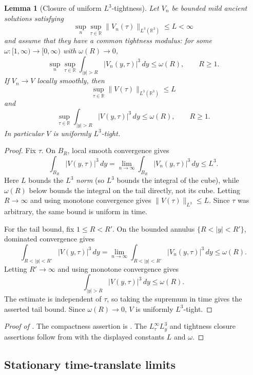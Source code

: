 \documentclass[11pt]{amsart}
\theoremstyle{plain}
\newtheorem{lemma}[lemma]{Lemma}
\theoremstyle{definition}
\theoremstyle{remark}
\numberwithin{equation}{section}
\newcommand{\R}{\mathbb R}
\begin{document}
\begin{lemma}[Closure of uniform \(L^3\)-tightness]\label{p2:lem:tight-closure}
Let \(V_n\) be bounded mild ancient solutions satisfying
\[
   \sup_n\sup_{\tau\in\R}\|V_n(\tau)\|_{L^3(\R^3)}\le L<\infty
\]
and assume that they have a common tightness modulus: for some
\(\omega:[1,\infty)\to[0,\infty)\) with \(\omega(R)\to0\),
\[
   \sup_n\sup_{\tau\in\R}
   \int_{|y|>R}|V_n(y,\tau)|^3\,dy\le \omega(R),
   \qquad R\ge1.
\]
If \(V_n\to V\) locally smoothly, then
\[
   \sup_{\tau\in\R}\|V(\tau)\|_{L^3(\R^3)}\le L
\]
and
\[
   \sup_{\tau\in\R}
   \int_{|y|>R}|V(y,\tau)|^3\,dy\le \omega(R),
   \qquad R\ge1.
\]
In particular \(V\) is uniformly \(L^3\)-tight.
\end{lemma}

\begin{proof}
Fix \(\tau\).  On \(B_R\), local smooth convergence gives
\[
   \int_{B_R}|V(y,\tau)|^3\,dy
   =
   \lim_{n\to\infty}\int_{B_R}|V_n(y,\tau)|^3\,dy
   \le L^3 .
\]
Here \(L\) bounds the \(L^3\) \emph{norm} (so \(L^3\) bounds the integral of
the cube), while \(\omega(R)\) below bounds the integral on the tail
directly, not its cube.
Letting \(R\to\infty\) and using monotone convergence gives
\(\|V(\tau)\|_{L^3}\le L\).  Since \(\tau\) was arbitrary, the same bound is
uniform in time.

For the tail bound, fix \(1\le R<R'\).  On the bounded annulus
\(\{R<|y|<R'\}\), dominated convergence gives
\[
   \int_{R<|y|<R'}|V(y,\tau)|^3\,dy
   =
   \lim_{n\to\infty}
   \int_{R<|y|<R'}|V_n(y,\tau)|^3\,dy
   \le \omega(R).
\]
Letting \(R'\to\infty\) and using monotone convergence gives
\[
   \int_{|y|>R}|V(y,\tau)|^3\,dy\le \omega(R).
\]
The estimate is independent of \(\tau\), so taking the supremum in time gives
the asserted tail bound.  Since \(\omega(R)\to0\), \(V\) is uniformly
\(L^3\)-tight.
\end{proof}

\begin{proof}[Proof of ]
The compactness assertion is .  The
\(L^\infty_\tau L^3_y\) and tightness closure assertions follow from
 with the displayed constants \(L\) and \(\omega\).
\end{proof}

\subsection{Stationary time-translate limits}
\end{document}
